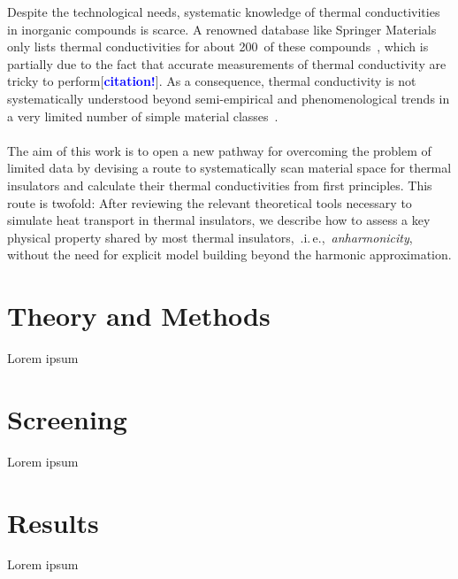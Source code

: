 \documentclass[a4paper,12pt]{book}
\newcommand{\REM}[1]{\textcolor{blue}{{\bf #1}}}
\begin{document}

Despite the technological needs, systematic knowledge of thermal conductivities in inorganic compounds is scarce. A renowned database like Springer Materials only lists thermal conductivities for about 200~of these compounds~\cite{SpringerMaterials}, which is partially due to the fact that accurate measurements of thermal conductivity are tricky to perform[\REM{citation!}]. As a consequence, thermal conductivity is not systematically understood beyond semi-empirical and phenomenological trends in a very limited number of simple material classes~\cite{Morelli}.
\\ \\
The aim of this work is to open a new pathway for overcoming the problem of limited data by devising a route to systematically scan material space for thermal insulators and calculate their thermal conductivities from first principles. This route is twofold: After reviewing the relevant theoretical tools necessary to simulate heat transport in thermal insulators, we describe how to assess a key physical property shared by most thermal insulators,~.i.\,e.,~\emph{anharmonicity}, without the need for explicit model building beyond the harmonic approximation.

\chapter{Theory and Methods}
Lorem ipsum

\chapter{Screening}
Lorem ipsum

\chapter{Results}
Lorem ipsum



\end{document}
